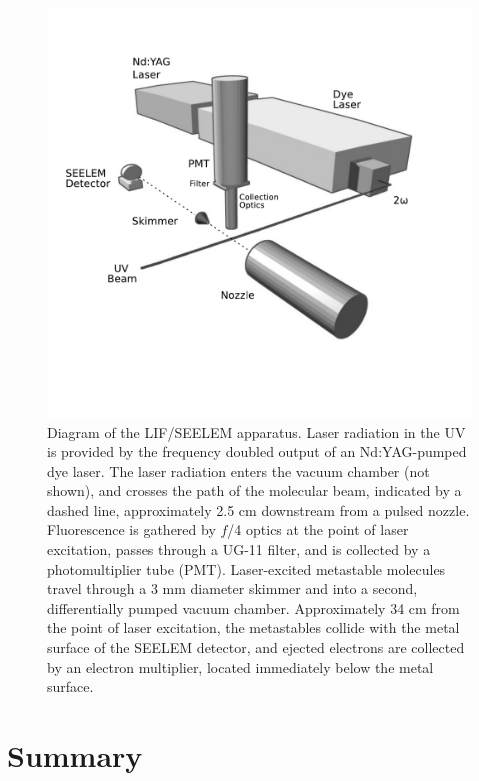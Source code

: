 \documentclass[12pt]{mitthesis}
\begin{document}
\begin{figure}
  \caption{Diagram of the LIF/SEELEM apparatus.  Laser radiation in
    the UV is provided by the frequency doubled output of an
    Nd:YAG-pumped dye laser.  The laser radiation enters the vacuum
    chamber (not shown), and crosses the path of the molecular beam,
    indicated by a dashed line, approximately 2.5 cm downstream from a
    pulsed nozzle.  Fluorescence is gathered by $f$/4 optics at the
    point of laser excitation, passes through a UG-11 filter, and is
    collected by a photomultiplier tube (PMT).  Laser-excited
    metastable molecules travel through a 3 mm diameter skimmer and
    into a second, differentially pumped vacuum chamber.
    Approximately 34 cm from the point of laser excitation, the
    metastables collide with the metal surface of the SEELEM detector,
    and ejected electrons are collected by an electron multiplier,
    located immediately below the metal surface.}
  \label{fig:apparatus}
  \centering
  \includegraphics[width=7in,trim=1cm 0 0 0]{apparatus-bw}
\end{figure}




\section{Summary}
\end{document}
